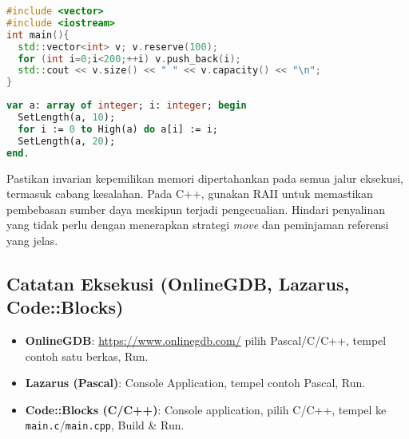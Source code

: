 \documentclass[../main.tex]{subfiles}
\begin{document}
\begin{lstlisting}[language=C++, caption={std::vector di C++}]
#include <vector>
#include <iostream>
int main(){
  std::vector<int> v; v.reserve(100);
  for (int i=0;i<200;++i) v.push_back(i);
  std::cout << v.size() << " " << v.capacity() << "\n";
}
\end{lstlisting}

\begin{lstlisting}[language=Pascal, caption={Array dinamis di Free Pascal}]
var a: array of integer; i: integer; begin
  SetLength(a, 10);
  for i := 0 to High(a) do a[i] := i;
  SetLength(a, 20);
end.
\end{lstlisting}

Pastikan invarian kepemilikan memori dipertahankan pada semua jalur eksekusi, termasuk cabang kesalahan. Pada C++, gunakan RAII untuk memastikan pembebasan sumber daya meskipun terjadi pengecualian. Hindari penyalinan yang tidak perlu dengan menerapkan strategi \emph{move} dan peminjaman referensi yang jelas.

\subsection{Catatan Eksekusi (OnlineGDB, Lazarus, Code::Blocks)}
\begin{itemize}
  \item \textbf{OnlineGDB}: \url{https://www.onlinegdb.com/} \textrightarrow{} pilih Pascal/C/C++, tempel contoh satu berkas, Run.
  \item \textbf{Lazarus (Pascal)}: Console Application, tempel contoh Pascal, Run.
  \item \textbf{Code::Blocks (C/C++)}: Console application, pilih C/C++, tempel ke \texttt{main.c}/\texttt{main.cpp}, Build \& Run.
\end{itemize}
\end{document}
